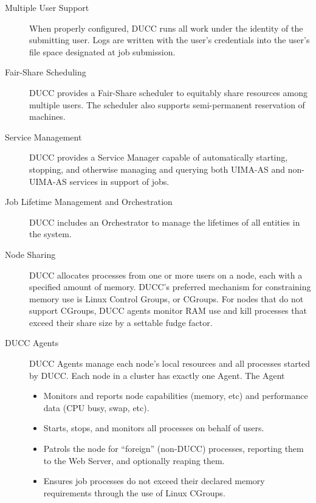     \begin{description}
        \item[Multiple User Support] When properly configured, 
          DUCC runs all work under the identity of the submitting user. Logs
          are written with the user's credentials into the user's file space designated at job
          submission.

        \item[Fair-Share Scheduling] DUCC provides a Fair-Share scheduler to equitably share
          resources among multiple users.  The scheduler also supports semi-permanent reservation of machines.

        \item[Service Management] DUCC provides a Service Manager capable of automatically starting, stopping, and
          otherwise managing and querying both UIMA-AS and non-UIMA-AS services in support of jobs.

        \item[Job Lifetime Management and Orchestration] DUCC includes an Orchestrator to manage the
          lifetimes of all entities in the system.

        \item[Node Sharing] DUCC allocates processes from one or more users on a node, each with a specified
          amount of memory.  DUCC's preferred mechanism for constraining memory use is Linux
          Control Groups, or CGroups.  For nodes that do not support CGroups, DUCC agents monitor
          RAM use and kill processes that exceed their share size by a settable fudge factor.

        \item[DUCC Agents] DUCC Agents manage each node's local resources and all
          processes started by DUCC. Each node in a cluster has exactly one Agent. The Agent
          \begin{itemize}
            \item Monitors and reports node capabilities (memory, etc) and performance data (CPU busy,
              swap, etc).
            \item Starts, stops, and monitors all processes on behalf of users.
            \item Patrols the node for ``foreign'' (non-DUCC) processes, reporting them to the
              Web Server, and optionally reaping them.
            \item Ensures job processes do not exceed their declared memory requirements
              through the use of Linux CGroups.
          \end{itemize}


\end{description}
